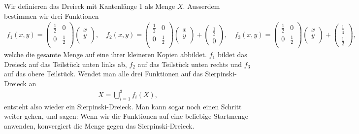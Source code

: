 Wir definieren das Dreieck mit Kantenlänge 1 als Menge $X$.
Ausserdem bestimmen wir drei Funktionen
\begin{align*}
	f_1(x,y)
	= 
	\begin{pmatrix}
		\frac{1}{2} & 0 \\
		0 & \frac{1}{2} \\
	\end{pmatrix}
	\begin{pmatrix}
		x\\
		y\\
	\end{pmatrix} 
	,\quad
	f_2(x,y)
	= 
	\begin{pmatrix}
		\frac{1}{2} & 0 \\
		0 & \frac{1}{2} \\
	\end{pmatrix}
	\begin{pmatrix}
		x\\
		y\\
	\end{pmatrix} 
	+
	\begin{pmatrix}
		\frac{1}{2} \\
		0
	\end{pmatrix}
	, \quad
	f_3(x,y)
	= 
	\begin{pmatrix}
		\frac{1}{2} & 0 \\
		0 & \frac{1}{2} \\
	\end{pmatrix}
	\begin{pmatrix}
		x\\
		y\\
	\end{pmatrix} 
	+
	\begin{pmatrix}
		\frac{1}{4} \\
		\frac{1}{2}
	\end{pmatrix},
\end{align*}
welche die gesamte Menge auf eine ihrer kleineren Kopien abbildet.
$f_1$ bildet das Dreieck auf das Teilstück unten links ab, $f_2$ auf das Teilstück unten rechts und $f_3$ auf das obere Teilstück.
Wendet man alle drei Funktionen auf das Sierpinski-Dreieck an
\begin{align*}
	X = \bigcup\limits_{i = 1}^{3} f_i(X),
\end{align*}
entsteht also wieder ein Sierpinski-Dreieck.
Man kann sogar noch einen Schritt weiter gehen, und sagen: Wenn wir die Funktionen auf eine beliebige Startmenge anwenden, konvergiert die Menge gegen das Sierpinski-Dreieck.
